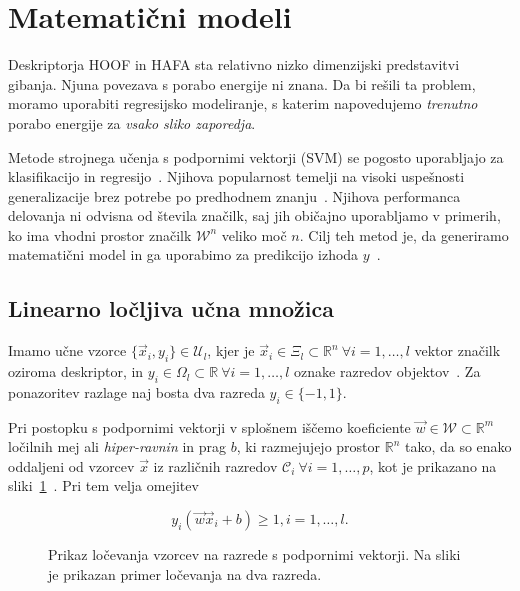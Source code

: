 \section{Matematični modeli}\label{sec:matematicni-modeli}
Deskriptorja HOOF in HAFA sta relativno nizko dimenzijski predstavitvi gibanja. Njuna povezava s porabo energije ni znana. Da bi rešili ta problem, moramo uporabiti regresijsko modeliranje, s katerim napovedujemo \emph{trenutno} porabo energije za \emph{vsako sliko zaporedja}.

Metode strojnega učenja s podpornimi vektorji (SVM) se pogosto uporabljajo za klasifikacijo in regresijo~\cite{chang2011a}. Njihova popularnost temelji na visoki uspešnosti generalizacije brez potrebe po predhodnem znanju~\cite{chapelle1999support}. Njihova performanca delovanja ni odvisna od števila značilk, saj jih običajno uporabljamo v primerih, ko ima vhodni prostor značilk $\mathcal{W}^n$ veliko moč $n$. Cilj teh metod je, da generiramo matematični model in ga uporabimo za predikcijo izhoda $y$~\cite{hsu2003practical}. 






\subsection{Linearno ločljiva učna množica}
Imamo učne vzorce $\{ \vec{x}_i, y_i \} \in \mathcal{U}_l$, kjer je $\vec{x}_i \in \mathcal{\Xi}_l \subset \mathbb{R}^n~\forall i = 1, \ldots, l$ vektor značilk oziroma deskriptor, in $y_i \in \mathit{\Omega}_l \subset \mathbb{R}~\forall i = 1, \ldots, l$ oznake razredov objektov~\cite{chapelle1999support}. Za ponazoritev razlage naj bosta dva razreda $y_i \in \{-1,1\}$. 

Pri postopku s podpornimi vektorji v splošnem iščemo koeficiente \hbox{$\vec{w}\in\mathcal{W}\subset\mathbb{R}^m$} ločilnih mej ali \emph{hiper-ravnin} in prag $b$, ki razmejujejo prostor $\mathbb{R}^n$ tako, da so enako oddaljeni od vzorcev $\vec{x}$ iz različnih razredov $\mathcal{C}_i~\forall i= 1, \ldots, p$, kot je prikazano na sliki~\ref{fig:svm-locljivo}~\cite{chapelle1999support}. Pri tem velja omejitev

\begin{equation}\label{eq:omejitev-ravnine}
	y_i(\vec{w} \vec{x}_i + b) \geq 1, i=1, \ldots, l.
\end{equation}





\begin{figure}[htb]
\centering

\caption[Prikaz ločevanja vzorcev na razrede s podpornimi vektorji]{Prikaz ločevanja vzorcev na razrede s podpornimi vektorji. Na sliki je prikazan primer ločevanja na dva razreda.}
\label{fig:svm-locljivo}
\end{figure}




